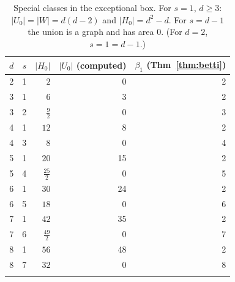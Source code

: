 \begin{longtable}{@{}rrrrr@{}}
\toprule $d$ & $s$ & $|H_0|$ & $|U_0|$ (computed) & $\beta_1$ (Thm~\ref{thm:betti})\\\midrule\endhead
2 & 1 & $2$ & 0 & 2\\
3 & 1 & $6$ & 3 & 2\\
3 & 2 & $\tfrac{9}{2}$ & 0 & 3\\
4 & 1 & $12$ & 8 & 2\\
4 & 3 & $8$ & 0 & 4\\
5 & 1 & $20$ & 15 & 2\\
5 & 4 & $\tfrac{25}{2}$ & 0 & 5\\
6 & 1 & $30$ & 24 & 2\\
6 & 5 & $18$ & 0 & 6\\
7 & 1 & $42$ & 35 & 2\\
7 & 6 & $\tfrac{49}{2}$ & 0 & 7\\
8 & 1 & $56$ & 48 & 2\\
8 & 7 & $32$ & 0 & 8\\
\bottomrule\caption{Special classes in the exceptional box. For $s=1$, $d\ge3$: $|U_0|=|W|=d(d-2)$ and $|H_0|=d^2-d$. For $s=d-1$ the union is a graph and has area $0$. (For $d=2$, $s=1=d-1$.)}\label{tab:special}\end{longtable}